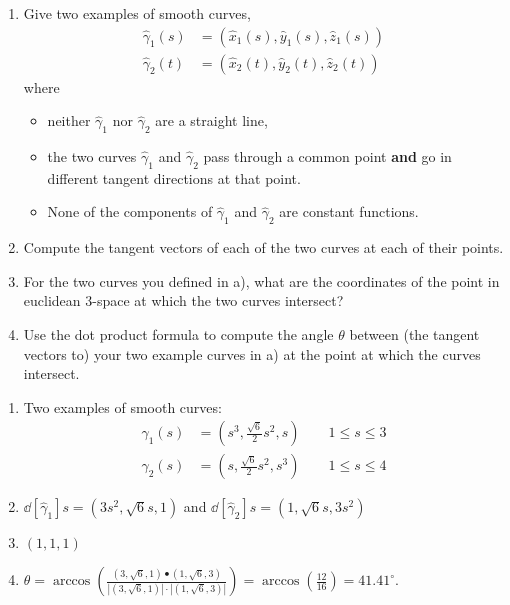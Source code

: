 \documentclass[newpage,hints,handout]{ximera}
\begin{document}
\begin{problem}\hfil
\begin{enumerate}
\label{1}\item Give two examples of smooth curves,
\begin{align*}
\hat{\gamma}_{1}(s) &=\left(\hat{x}_{1}(s),\hat{y}_{1}(s),\hat{z}_{1}(s)\right) \\
\hat{\gamma}_{2}(t) &=\left(\hat{x}_{2}(t),\hat{y}_{2}(t),\hat{z}_{2}(t)\right)
\end{align*}
where
\begin{itemize}
\item neither $\hat{\gamma}_1$ nor $\hat{\gamma}_2$ are a straight line,
\item the two curves $\hat{\gamma}_1$ and $\hat{\gamma}_2$ pass through a common
  point \textbf{and} go in different tangent directions at that point.
\item None of the components of $\hat{\gamma}_1$ and $\hat{\gamma}_2$ are
  constant functions.
\end{itemize}

\item Compute the tangent vectors of each of the two curves at each of their
  points.

\item For the two curves you defined in a), what are the coordinates of the
  point in euclidean $3$-space at which the two curves intersect?

\item Use the dot product formula to compute the angle $\theta$ between (the
tangent vectors to) your two example curves in a) at the point at which the
curves intersect. %
\end{enumerate}


\begin{freeResponse} 
\begin{enumerate}
\label{1}\item Two examples of smooth curves:
\begin{align*}
\hat{\gamma}_{1}(s) &=\left(s^3, \frac{\sqrt{6}}{2}s^2, s\right) \qquad 1 \leq s\leq3 \\
\hat{\gamma}_{2}(s) &=\left(s, \frac{\sqrt{6}}{2}s^2, s^3\right) \qquad 1 \leq s\leq4
\end{align*}

\item  $\dd[\hat{\gamma}_{1}]{s} = \left(3s^2, \sqrt{6}s, 1 \right)$ and 
$\dd[\hat{\gamma}_{2}]{s} =  \left(1, \sqrt{6}s,  3s^2 \right)$

\item $\left(1,1,1 \right)$

\item 
$\theta = \arccos \left( 
   \frac{ \left(3, \sqrt{6} , 1 \right) \bullet \left(1, \sqrt{6} , 3 \right)}
   { |\left(3, \sqrt{6} , 1 \right)| \cdot |\left(1, \sqrt{6} , 3 \right)|} \right)
= \arccos \left( \frac{12}{16} \right) = 41.41^{\circ}.$

\end{enumerate}
\end{freeResponse}

\end{problem}
\end{document}
